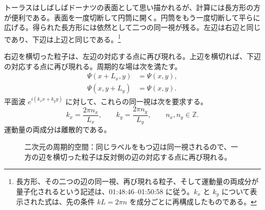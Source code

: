 トーラスはしばしばドーナツの表面として思い描かれるが、計算には長方形の方が便利である。表面を一度切断して円筒に開く。円筒をもう一度切断して平らに広げる。得られた長方形には依然として二つの同一視が残る。左辺は右辺と同じであり、下辺は上辺と同じである。\footnote{長方形、その二つの辺の同一視、再び現れる粒子、そして運動量の両成分が量子化されるという記述は、01:48:46--01:50:58 に従う。\(k_x\) と \(k_y\) について表示された式は、先の条件 \(kL=2\pi n\) を成分ごとに再構成したものである。}

右辺を横切った粒子は、左辺の対応する点に再び現れる。上辺を横切れば、下辺の対応する点に再び現れる。周期的な場は次を満たす。
\begin{align}
\Psi(x+L_x,y)&=\Psi(x,y),\\
\Psi(x,y+L_y)&=\Psi(x,y).
\end{align}
平面波 \(e^{i(k_x x+k_y y)}\) に対して、これらの同一視は次を要求する。
\begin{equation}
k_x=\frac{2\pi n_x}{L_x},
\qquad
k_y=\frac{2\pi n_y}{L_y},
\qquad
n_x,n_y\in\mathbb Z.
\end{equation}
運動量の両成分は離散的である。

\begin{figure}[t]
\centering
{}
\caption{二次元の周期的空間：同じラベルをもつ辺は同一視されるので、一方の辺を横切った粒子は反対側の辺の対応する点に再び現れる。}
\end{figure}

\begin{classroomqa}
\end{classroomqa}

